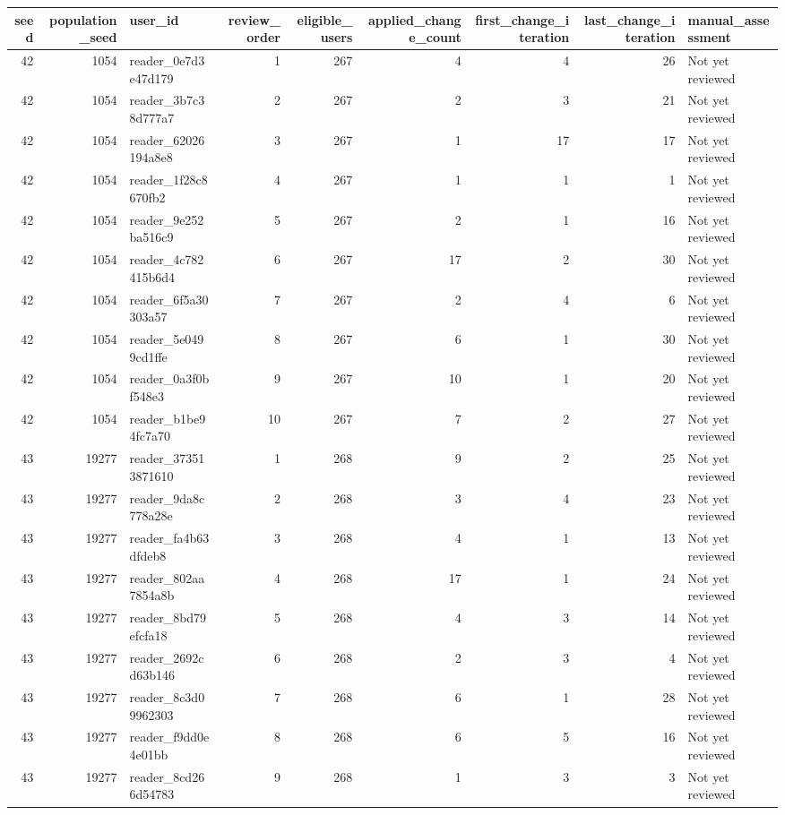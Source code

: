 \begin{table}[htbp!]
\centering
\small
\setlength{\tabcolsep}{3pt}
\renewcommand{\arraystretch}{1.1}
\begin{tabular}{rrlrrrrrl}
\hline
seed & population\_seed & user\_id & review\_order & eligible\_users & applied\_change\_count & first\_change\_iteration & last\_change\_iteration & manual\_assessment \\
\hline
42 & 1054 & reader\_0e7d3e47d179 & 1 & 267 & 4 & 4 & 26 & Not yet reviewed \\
42 & 1054 & reader\_3b7c38d777a7 & 2 & 267 & 2 & 3 & 21 & Not yet reviewed \\
42 & 1054 & reader\_62026194a8e8 & 3 & 267 & 1 & 17 & 17 & Not yet reviewed \\
42 & 1054 & reader\_1f28c8670fb2 & 4 & 267 & 1 & 1 & 1 & Not yet reviewed \\
42 & 1054 & reader\_9e252ba516c9 & 5 & 267 & 2 & 1 & 16 & Not yet reviewed \\
42 & 1054 & reader\_4c782415b6d4 & 6 & 267 & 17 & 2 & 30 & Not yet reviewed \\
42 & 1054 & reader\_6f5a30303a57 & 7 & 267 & 2 & 4 & 6 & Not yet reviewed \\
42 & 1054 & reader\_5e0499cd1ffe & 8 & 267 & 6 & 1 & 30 & Not yet reviewed \\
42 & 1054 & reader\_0a3f0bf548e3 & 9 & 267 & 10 & 1 & 20 & Not yet reviewed \\
42 & 1054 & reader\_b1be94fc7a70 & 10 & 267 & 7 & 2 & 27 & Not yet reviewed \\
43 & 19277 & reader\_373513871610 & 1 & 268 & 9 & 2 & 25 & Not yet reviewed \\
43 & 19277 & reader\_9da8c778a28e & 2 & 268 & 3 & 4 & 23 & Not yet reviewed \\
43 & 19277 & reader\_fa4b63dfdeb8 & 3 & 268 & 4 & 1 & 13 & Not yet reviewed \\
43 & 19277 & reader\_802aa7854a8b & 4 & 268 & 17 & 1 & 24 & Not yet reviewed \\
43 & 19277 & reader\_8bd79efcfa18 & 5 & 268 & 4 & 3 & 14 & Not yet reviewed \\
43 & 19277 & reader\_2692cd63b146 & 6 & 268 & 2 & 3 & 4 & Not yet reviewed \\
43 & 19277 & reader\_8c3d09962303 & 7 & 268 & 6 & 1 & 28 & Not yet reviewed \\
43 & 19277 & reader\_f9dd0e4e01bb & 8 & 268 & 6 & 5 & 16 & Not yet reviewed \\
43 & 19277 & reader\_8cd266d54783 & 9 & 268 & 1 & 3 & 3 & Not yet reviewed \\

\end{tabular}
\end{table}
